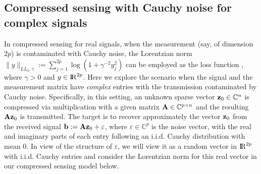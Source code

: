 \documentclass[10pt]{article}
\numberwithin{equation}{section}
\def\R{{\rm I\!R}}
\begin{document}
\subsection{Compressed sensing with Cauchy noise for complex signals}\label{sec6.2}
{\color{blue} In compressed sensing for real signals, when the measurement (say, of dimension $2p$) is contaminated with Cauchy noise, the Lorentzian norm $\|y\|_{LL_2,\gamma}:= \sum\limits_{j=1}^{2p}\log(1 + \gamma^{-2}y_j^2)$ can be employed as the loss function \cite{CaBA10,CaRA16}, where $\gamma > 0$ and $y\in \R^{2p}$. Here we explore the scenario when the signal and the measurement matrix have \emph{complex} entries with the transmission contaminated by Cauchy noise. Specifically, in this setting, an unknown sparse vector ${\bf z}_0\in {\mathbb{C}}^n$ is compressed via multiplication with a given matrix ${\bf A}\in \mathbb{C}^{p\times n}$ and the resulting ${\bf A} {\bf z}_0$ is transmitted. The target is to recover approximately the vector ${\bf z}_0$ from the received signal ${\bf b} := {\bf A}{\bf z}_0 + \varepsilon$, where $\varepsilon \in {\mathbb{C}}^p$ is the noise vector, with the real and imaginary parts of each entry following an i.i.d. Cauchy distribution with mean $0$. In view of the structure of $\varepsilon$, we will view it as a random vector in $\R^{2p}$ with i.i.d. Cauchy entries and consider the Lorentzian norm for this real vector in our compressed sensing model below.

}
\end{document}
